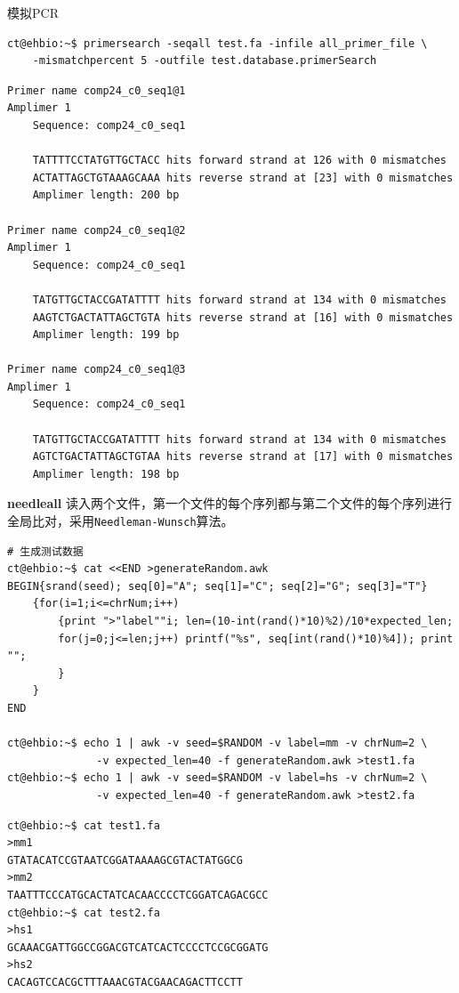 \documentclass[]{article}
\numberwithin{figure}{section}
\numberwithin{table}{section}
\begin{document}
模拟PCR

\begin{verbatim}
ct@ehbio:~$ primersearch -seqall test.fa -infile all_primer_file \
	-mismatchpercent 5 -outfile test.database.primerSearch
\end{verbatim}

\begin{verbatim}
Primer name comp24_c0_seq1@1
Amplimer 1
	Sequence: comp24_c0_seq1  
	
	TATTTTCCTATGTTGCTACC hits forward strand at 126 with 0 mismatches
	ACTATTAGCTGTAAAGCAAA hits reverse strand at [23] with 0 mismatches
	Amplimer length: 200 bp

Primer name comp24_c0_seq1@2
Amplimer 1
	Sequence: comp24_c0_seq1  
	
	TATGTTGCTACCGATATTTT hits forward strand at 134 with 0 mismatches
	AAGTCTGACTATTAGCTGTA hits reverse strand at [16] with 0 mismatches
	Amplimer length: 199 bp

Primer name comp24_c0_seq1@3
Amplimer 1
	Sequence: comp24_c0_seq1  
	
	TATGTTGCTACCGATATTTT hits forward strand at 134 with 0 mismatches
	AGTCTGACTATTAGCTGTAA hits reverse strand at [17] with 0 mismatches
	Amplimer length: 198 bp
\end{verbatim}

\textbf{needleall} 读入两个文件，第一个文件的每个序列都与第二个文件的每个序列进行全局比对，采用\texttt{Needleman-Wunsch}算法。

\begin{verbatim}
# 生成测试数据
ct@ehbio:~$ cat <<END >generateRandom.awk
BEGIN{srand(seed); seq[0]="A"; seq[1]="C"; seq[2]="G"; seq[3]="T"}
	{for(i=1;i<=chrNum;i++) 
		{print ">"label""i; len=(10-int(rand()*10)%2)/10*expected_len; 
	    for(j=0;j<=len;j++) printf("%s", seq[int(rand()*10)%4]); print "";
	    }
	} 
END

ct@ehbio:~$ echo 1 | awk -v seed=$RANDOM -v label=mm -v chrNum=2 \
			  -v expected_len=40 -f generateRandom.awk >test1.fa
ct@ehbio:~$ echo 1 | awk -v seed=$RANDOM -v label=hs -v chrNum=2 \
			  -v expected_len=40 -f generateRandom.awk >test2.fa
\end{verbatim}

\begin{verbatim}
ct@ehbio:~$ cat test1.fa
>mm1
GTATACATCCGTAATCGGATAAAAGCGTACTATGGCG
>mm2
TAATTTCCCATGCACTATCACAACCCCTCGGATCAGACGCC
ct@ehbio:~$ cat test2.fa
>hs1
GCAAACGATTGGCCGGACGTCATCACTCCCCTCCGCGGATG
>hs2
CACAGTCCACGCTTTAAACGTACGAACAGACTTCCTT
\end{verbatim}
\end{document}
